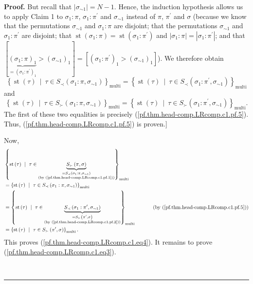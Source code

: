 \documentclass[numbers=enddot,12pt,final,onecolumn,notitlepage]{scrartcl}%
\theoremstyle{definition}
\newenvironment{proof}[1][Proof]{\noindent\textbf{#1.} }{\ \rule{0.5em}{0.5em}}
\begin{document}
\begin{proof}
But recall that $\left\vert \sigma_{\sim1}\right\vert =N-1$. Hence, the
induction hypothesis allows us to apply Claim 1 to $\sigma_{1}:\pi$,
$\sigma_{1}:\pi^{\prime}$ and $\sigma_{\sim1}$ instead of $\pi$, $\pi^{\prime
}$ and $\sigma$ (because we know that the permutations $\sigma_{\sim1}$ and
$\sigma_{1}:\pi$ are disjoint; that the permutations $\sigma_{\sim1}$ and
$\sigma_{1}:\pi^{\prime}$ are disjoint; that $\operatorname*{st}\left(
\sigma_{1}:\pi\right)  =\operatorname*{st}\left(  \sigma_{1}:\pi^{\prime
}\right)  $ and $\left\vert \sigma_{1}:\pi\right\vert =\left\vert \sigma
_{1}:\pi^{\prime}\right\vert $; and that $\left[  \underbrace{\left(
\sigma_{1}:\pi\right)  _{1}}_{=\left(  \sigma_{1}:\pi^{\prime}\right)  _{1}%
}>\left(  \sigma_{\sim1}\right)  _{1}\right]  =\left[  \left(  \sigma_{1}%
:\pi^{\prime}\right)  _{1}>\left(  \sigma_{\sim1}\right)  _{1}\right]  $). We
therefore obtain%
\[
\left\{  \operatorname*{st}\left(  \tau\right)  \ \mid\ \tau\in S_{\prec
}\left(  \sigma_{1}:\pi,\sigma_{\sim1}\right)  \right\}
_{\operatorname*{multi}}=\left\{  \operatorname*{st}\left(  \tau\right)
\ \mid\ \tau\in S_{\prec}\left(  \sigma_{1}:\pi^{\prime},\sigma_{\sim
1}\right)  \right\}  _{\operatorname*{multi}}%
\]
and%
\[
\left\{  \operatorname*{st}\left(  \tau\right)  \ \mid\ \tau\in S_{\succ
}\left(  \sigma_{1}:\pi,\sigma_{\sim1}\right)  \right\}
_{\operatorname*{multi}}=\left\{  \operatorname*{st}\left(  \tau\right)
\ \mid\ \tau\in S_{\succ}\left(  \sigma_{1}:\pi^{\prime},\sigma_{\sim
1}\right)  \right\}  _{\operatorname*{multi}}.
\]
The first of these two equalities is precisely
(\ref{pf.thm.head-comp.LRcomp.c1.pf.5}). Thus,
(\ref{pf.thm.head-comp.LRcomp.c1.pf.5}) is proven.]

Now,
\begin{align}
&  \left\{  \operatorname*{st}\left(  \tau\right)  \ \mid\ \tau\in
\underbrace{S_{\succ}\left(  \pi,\sigma\right)  }_{\substack{=S_{\prec}\left(
\sigma_{1}:\pi,\sigma_{\sim1}\right)  \\\text{(by
(\ref{pf.thm.head-comp.LRcomp.c1.pf.1}))}}}\right\}  _{\operatorname*{multi}%
}\nonumber\\
&  =\left\{  \operatorname*{st}\left(  \tau\right)  \ \mid\ \tau\in S_{\prec
}\left(  \sigma_{1}:\pi,\sigma_{\sim1}\right)  \right\}
_{\operatorname*{multi}}\nonumber\\
&  =\left\{  \operatorname*{st}\left(  \tau\right)  \ \mid\ \tau
\in\underbrace{S_{\prec}\left(  \sigma_{1}:\pi^{\prime},\sigma_{\sim1}\right)
}_{\substack{=S_{\succ}\left(  \pi^{\prime},\sigma\right)  \\\text{(by
(\ref{pf.thm.head-comp.LRcomp.c1.pf.2}))}}}\right\}  _{\operatorname*{multi}%
}\ \ \ \ \ \ \ \ \ \ \left(  \text{by (\ref{pf.thm.head-comp.LRcomp.c1.pf.5}%
)}\right) \nonumber\\
&  =\left\{  \operatorname*{st}\left(  \tau\right)  \ \mid\ \tau\in S_{\succ
}\left(  \pi^{\prime},\sigma\right)  \right\}  _{\operatorname*{multi}}.
\label{pf.thm.head-comp.LRcomp.c1.pf.6}%
\end{align}
This proves (\ref{pf.thm.head-comp.LRcomp.c1.eq4}). It remains to prove
(\ref{pf.thm.head-comp.LRcomp.c1.eq3}).


\end{proof}
\end{document}
